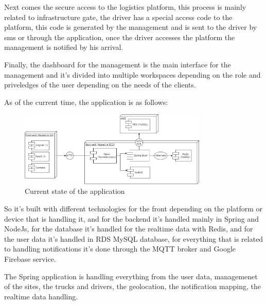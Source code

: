 Next comes the secure access to the logistics platform, this process is mainly related to infrastructure gate,
the driver has a special access code to the platform, this code is generated by the management and is sent to
the driver by sms or through the application, once the driver accesses the platform the management is notified
by his arrival.

Finally, the dashboard for the management is the main interface for the management and it's divided into multiple
workspaces depending on the role and priveledges of the user depending on the needs of the clients.

As of the current time, the application is as follows:

\begin{figure}[!htpb]
    \centering
    \includegraphics[width=0.8\textwidth]{images/State-of-art}
    \caption{\footnotesize{Current state of the application}}
    \label{fig:state-of-art}
\end{figure}

So it's built with different technologies for the front depending on the platform or device
that is handling it, and for the backend it's handled mainly in Spring and NodeJs, for
the database it's handled for the realtime data with Redis, and for the user data it's 
handled in RDS MySQL database, for everything that is related to handling notifications
it's done through the MQTT broker and Google Firebase service.

The Spring application is handling everything from the user data, managemenet of the sites,
the trucks and drivers, the geolocation, the notification mapping, the realtime data
handling.



